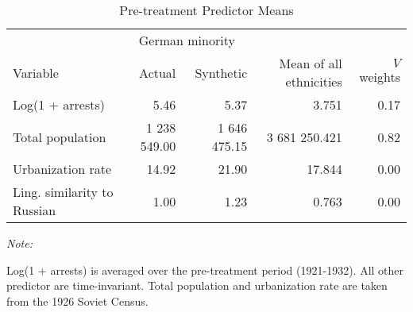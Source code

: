 \begin{table}[!h]

\caption{\label{tab:sc_predictor_means_robustness}Pre-treatment Predictor Means}
\centering
\begin{threeparttable}
\fontsize{10}{12}\selectfont
\begin{tabular}{lrrrr}
\toprule
\multicolumn{1}{c}{ } & \multicolumn{2}{c}{German minority} \\
\cmidrule(l{2pt}r{2pt}){2-3}
Variable & Actual & Synthetic & Mean of all ethnicities & $V$ weights\\
\midrule
Log(1 + arrests) & 5.46 & 5.37 & 3.751 & 0.17\\
Total population & 1 238 549.00 & 1 646 475.15 & 3 681 250.421 & 0.82\\
Urbanization rate & 14.92 & 21.90 & 17.844 & 0.00\\
Ling. similarity to Russian & 1.00 & 1.23 & 0.763 & 0.00\\
\bottomrule
\end{tabular}
\begin{tablenotes}
\item \textit{Note: } 
\item Log(1 + arrests) is averaged over the pre-treatment period (1921-1932). All other predictor are time-invariant. Total population and urbanization rate are taken from the 1926 Soviet Census.
\end{tablenotes}
\end{threeparttable}
\end{table}